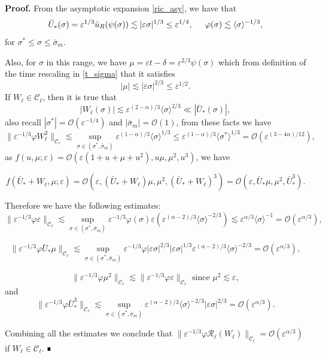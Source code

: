 \documentclass[letterpaper,11pt]{article}
\newcommand{\rmO}{\mathcal{O}}
\newcommand{\eps}{\varepsilon}
\newcommand{\lar}{ \lesssim }
\numberwithin{equation}{section}
\theoremstyle{plain}
\newenvironment{Proof}[1][.]%
 {\begin{trivlist}\item[]\textbf{Proof#1 }}%
 {\hspace*{\fill}$\rule{0.3\baselineskip}{0.35\baselineskip}$\end{trivlist}}
\begin{document}
\begin{Proof}
From the asymptotic expansion \eqref{ric_asy}, we have that
\[
\bar{U}_*(\sigma) = \eps^{1/3} \bar{u}_R(\psi(\sigma)) \lar |\eps \sigma|^{1/3}\le \eps^{1/4}, \hspace{0.2in} \varphi(\sigma) \lar \langle\sigma\rangle^{-1/3} ,
\]
for $\sigma^*\le \sigma \le \bar{\sigma}_m$.

Also, for $\sigma$ in this range, we have $\mu = \eps t -\delta = \eps^{2/3}\psi(\sigma)$ which from definition of the time rescaling in \ref{t_sigma}  that it satisfies
\[
|\mu| \lar |\eps \sigma|^{2/3} \le \eps^{1/2}.
\]
If $W_\ell \in \mathcal{C}_\ell$, then it is true that
\[
|W_\ell(\sigma)| \lar \eps^{(2-\alpha)/3} \langle \sigma \rangle^{2/3} \ll |\bar{U}_*(\sigma)|, 
\]
also recall $|\sigma^*| = \rmO(\eps^{-1/4})$ and $|\bar{\sigma}_m| = \rmO(1)$, from these facts we have
\[
\|\eps^{-1/3}\varphi W_\ell^2\|_{\mathcal{C}_\ell} \lar \sup_{\sigma \in (\sigma^{*},\bar{\sigma}_m)} \eps^{(1-\alpha)/3}\langle \sigma\rangle^{1/3}  \le \eps^{(1-\alpha)/3} \langle \sigma^{*} \rangle^{1/3} = \rmO(\eps^{(3-4\alpha)/12}),
\]
as $f(u,\mu; \eps) = \rmO(\eps(1+u+\mu+u^2),u\mu,\mu^2,u^3)$, we have

\[
f(\bar{U}_*+W_\ell, \mu ;\eps) = \rmO(\eps, (\bar{U}_*+W_\ell)\mu, \mu^2, (\bar{U}_*+W_\ell)^3 ) = \rmO(\eps, \bar{U}_*\mu, \mu^2, \bar{U}_*^3).
\]

Therefore we have the following estimates:
\[
\|\eps^{-1/3}\varphi \eps \|_{\mathcal{C}_\ell} \lar \sup_{\sigma \in (\sigma^{*},\bar{\sigma}_m)} \eps^{-1/3} \varphi(\sigma) \eps (\eps^{(\alpha-2)/3}\langle \sigma\rangle^{-2/3}) \lar \eps^{\alpha/3} \langle\sigma\rangle^{-1} =\rmO(\eps^{\alpha/3}),
\]

\[
\|\eps^{-1/3}\varphi \bar{U}_*\mu \|_{\mathcal{C}_\ell} \lar \sup_{\sigma \in (\sigma^{*},\bar{\sigma}_m)} \eps^{-1/3}\varphi |\eps\sigma|^{2/3}|\eps\sigma|^{1/3}\eps^{(\alpha-2)/3}\langle \sigma\rangle^{-2/3}  = \rmO(\eps^{\alpha/3}),
\]

\[
\|\eps^{-1/3}\varphi \mu^2 \|_{\mathcal{C}_\ell} \lar \|\eps^{-1/3}\varphi \eps \|_{\mathcal{C}_\ell} \text{ since } \mu^2 \lar \eps,
\]
and 
\[
\|\eps^{-1/3}\varphi \bar{U}_*^3 \|_{\mathcal{C}_\ell}  \lar \sup_{\sigma \in (\sigma^{*},\bar{\sigma}_m)}\eps^{(\alpha-2)/3}\langle \sigma\rangle^{-2/3} |\eps \sigma|^{2/3} = \rmO(\eps^{\alpha/3}).
\]

Combining all the estimates we conclude that $\|\eps^{-1/3}\varphi \mathcal{R}_\ell(W_\ell)\|_{\mathcal{C}_\ell} = \rmO(\eps^{\alpha/3})$ if $W_\ell \in \mathcal{C}_\ell$.
\end{Proof}
\end{document}
